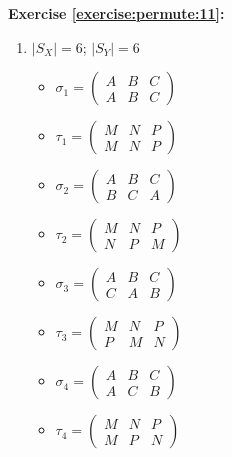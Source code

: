 \noindent\textbf{Exercise \ref{exercise:permute:11}:}
\begin{enumerate}[{a.}]
\item
$|S_X| = 6$; $|S_Y| = 6$\\
	\begin{multicols}{2}
	\begin{itemize}
	\item
	$\sigma_1 = \begin{pmatrix}
	A & B & C\\
	A & B & C
	\end{pmatrix}$

	\item
	$\tau_1 = \begin{pmatrix}
	M & N & P\\
	M & N & P
	\end{pmatrix}$

	\item
	$\sigma_2 = \begin{pmatrix}
	A & B & C\\
	B & C & A
	\end{pmatrix}$

	\item
	$\tau_2 = \begin{pmatrix}
	M & N & P\\
	N & P & M
	\end{pmatrix}$
	
	\item
	$\sigma_3 = \begin{pmatrix}
	A & B & C\\
	C & A & B
	\end{pmatrix}$

	\item
	$\tau_3 = \begin{pmatrix}
	M & N & P\\
	P & M & N
	\end{pmatrix}$\\

	\item
	$\sigma_4 = \begin{pmatrix}
	A & B & C\\
	A & C & B
	\end{pmatrix}$

	\item
	$\tau_4 = \begin{pmatrix}
	M & N & P\\
	M & P & N
	\end{pmatrix}$\\


\end{itemize}
\end{multicols}
\end{enumerate}
